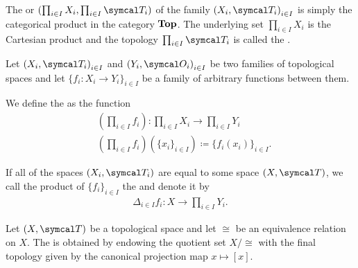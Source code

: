 \begin{definition}\label{def:topological_product}
  The  or  \( (\prod_{i \in I} X_i, \prod_{i \in I} \Cal{T}_i) \) of the family \( { (X_i, \Cal{T}_i) }_{i \in I} \) is simply the categorical product in the category \( \operatorname{\mathbf{Top}} \). The underlying set \( \prod_{i \in I} X_i \) is the Cartesian product and the topology \( \prod_{i \in I} \Cal{T}_i \) is called the .

  Let \( { (X_i, \Cal{T}_i) }_{i \in I} \) and \( { (Y_i, \Cal{O}_i) }_{i \in I} \) be two families of topological spaces and let \( \{ f_i: X_i \to Y_i \}_{i \in I} \) be a family of arbitrary functions between them.

  We define the  as the function
  \begin{align*}
    &\left(\prod_{i \in I} f_i \right): \prod_{i \in I} X_i \to \prod_{i \in I} Y_i \\
    &\left(\prod_{i \in I} f_i \right)(\{ x_i \}_{i \in I}) \coloneqq \{ f_i (x_i) \}_{i \in I}.
  \end{align*}

  If all of the spaces \( (X_i, \Cal{T}_i) \) are equal to some space \( (X, \Cal{T}) \), we call the product of \( \{ f_i \}_{i \in I} \) the  and denote it by
  \begin{align*}
    \Delta_{i \in I} f_i: X \to \prod_{i \in I} Y_i.
  \end{align*}
\end{definition}

\begin{definition}\label{def:topological_quotient}\cite[90]{Engelking1989}
  Let \( (X, \Cal{T}) \) be a topological space and let \( \cong \) be an equivalence relation on \( X \). The  is obtained by endowing the quotient set \( X / \cong \) with the final topology given by the canonical projection map \( x \mapsto [x] \).
\end{definition}

